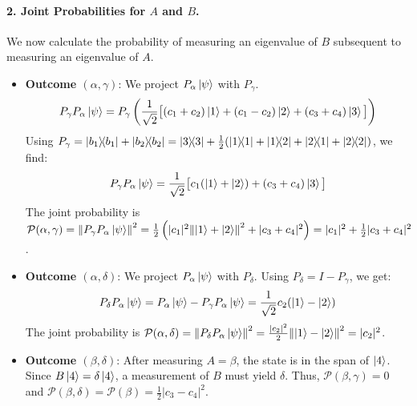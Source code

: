 \documentclass[11pt,a4paper]{article}
\begin{document}
  \paragraph{2. Joint Probabilities for $A$ and $B$.}
  We now calculate the probability of measuring an eigenvalue of $B$ subsequent to
  measuring an eigenvalue of $A$.
  \begin{itemize}
    \item \textbf{Outcome $(\alpha, \gamma)$}: We project $P_\alpha \ket{\psi}$
      with $P_\gamma$.
      $$ P_\gamma P_\alpha \ket{\psi} = P_\gamma \left( \frac{1}{\sqrt{2}} \big[
      (c_1+c_2)\ket{1} + (c_1-c_2)\ket{2} + (c_3+c_4)\ket{3} \big] \right) $$
      Using $P_\gamma = \dyad{b_1}{b_1}+\dyad{b_2}{b_2} = \dyad{3}{3} +
      \frac{1}{2}(\dyad{1}{1}+\dyad{1}{2}+\dyad{2}{1}+\dyad{2}{2})$, we find:
      $$ P_\gamma P_\alpha \ket{\psi} = \frac{1}{\sqrt{2}} \big[
      c_1(\ket{1}+\ket{2}) + (c_3+c_4)\ket{3} \big] $$
      The joint probability is $\mathcal{P}(\alpha, \gamma) = \norm{P_\gamma
        P_\alpha \ket{\psi}}^2 = \frac{1}{2}\left( |c_1|^2 \norm{\ket{1}+\ket{2}}^2
      + |c_3+c_4|^2 \right) = |c_1|^2 + \frac{1}{2}|c_3+c_4|^2$.

    \item \textbf{Outcome $(\alpha, \delta)$}: We project $P_\alpha \ket{\psi}$
      with $P_\delta$. Using $P_\delta = I - P_\gamma$, we get:
      $$ P_\delta P_\alpha \ket{\psi} = P_\alpha \ket{\psi} - P_\gamma P_\alpha
      \ket{\psi} = \frac{1}{\sqrt{2}} c_2(\ket{1}-\ket{2}) $$
      The joint probability is $\mathcal{P}(\alpha, \delta) = \norm{P_\delta
      P_\alpha \ket{\psi}}^2 = \frac{|c_2|^2}{2}\norm{\ket{1}-\ket{2}}^2 =
      |c_2|^2$.

    \item \textbf{Outcome $(\beta, \delta)$}: After measuring $A=\beta$, the state
      is in the span of $\ket{4}$. Since $B\ket{4}=\delta\ket{4}$, a measurement
      of $B$ must yield $\delta$. Thus, $\mathcal{P}(\beta, \gamma)=0$ and
      $\mathcal{P}(\beta, \delta) = \mathcal{P}(\beta) = \frac{1}{2}|c_3-c_4|^2$.
  \end{itemize}
\end{document}
